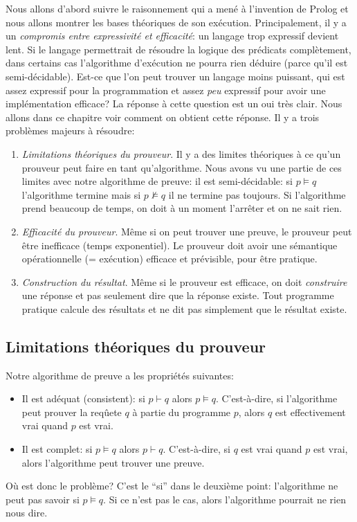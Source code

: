 Nous allons d'abord suivre le raisonnement qui a mené à l'invention de Prolog
et nous allons montrer les bases théoriques de son exécution.
Principalement, il y a un {\em compromis entre expressivité et efficacité}:
un langage trop expressif devient lent.
Si le langage permettrait de résoudre la logique des prédicats complètement,
dans certains cas l'algorithme d'exécution ne pourra rien déduire (parce qu'il est semi-décidable).
Est-ce que l'on peut trouver un langage moins puissant, qui est assez expressif pour la programmation
et assez {\em peu} expressif pour avoir une implémentation efficace?
La réponse à cette question est un oui très clair.
Nous allons dans ce chapitre voir comment on obtient cette réponse.
Il y a trois problèmes majeurs à résoudre:
\begin{enumerate}
\item {\em Limitations théoriques du prouveur}.
Il y a des limites théoriques à ce qu'un prouveur peut faire en tant qu'algorithme.
Nous avons vu une partie de ces limites avec notre algorithme de preuve:
il est semi-décidable: si $p \models q$ l'algorithme termine mais si $p \not\models q$ il ne termine pas toujours.
Si l'algorithme prend beaucoup de temps, on doit à un moment l'arrêter et on ne sait rien.
\item {\em Efficacité du prouveur}.
Même si on peut trouver une preuve, le prouveur peut être inefficace (temps exponentiel).
Le prouveur doit avoir une sémantique opérationnelle (= exécution) efficace et prévisible, pour être pratique.
\item {\em Construction du résultat}.
Même si le prouveur est efficace, on doit {\em construire} une réponse et pas seulement dire que la réponse existe.
Tout programme pratique calcule des résultats et ne dit pas simplement que le résultat existe.
\end{enumerate}

\subsection{Limitations théoriques du prouveur}

Notre algorithme de preuve a les propriétés suivantes:
\begin{itemize}
\item Il est adéquat (consistent): si $p \vdash q$ alors $p \models q$.
C'est-à-dire, si l'algorithme peut prouver la reqûete $q$ à partie du programme $p$,
alors $q$ est effectivement vrai quand $p$ est vrai.
\item Il est complet: si $p \models q$ alors $p \vdash q$.
C'est-à-dire, si $q$ est vrai quand $p$ est vrai, alors l'algorithme peut trouver une preuve.
\end{itemize}
Où est donc le problème?
C'est le ``si'' dans le deuxième point: l'algorithme ne peut pas savoir si $p \models q$.
Si ce n'est pas le cas, alors l'algorithme pourrait ne rien nous dire.

